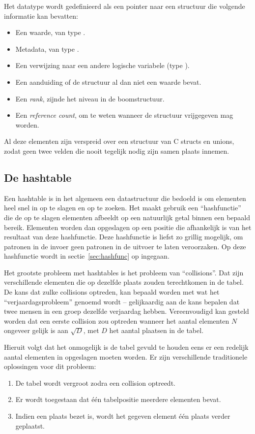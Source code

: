 Het datatype  wordt gedefinieerd als een pointer naar een structuur die volgende informatie kan bevatten: \begin{itemize}
  \item Een waarde, van type .
  \item Metadata, van type .
  \item Een verwijzing naar een andere logische variabele (type ).
  \item Een aanduiding of de structuur al dan niet een waarde bevat.
  \item Een {\em rank}, zijnde het niveau in de boomstructuur.
  \item Een {\em reference count}, om te weten wanneer de structuur vrijgegeven mag worden.
\end{itemize}
Al deze elementen zijn verspreid over een structuur van C structs en unions, zodat geen twee velden die nooit tegelijk nodig zijn samen plaats innemen.

\subsection{De hashtable} \label{sec:hashtable}

Een hashtable is in het algemeen een datastructuur die bedoeld is om elementen heel snel in op te slagen en op te zoeken. Het maakt gebruik een ``hashfunctie'' die de op te slagen elementen afbeeldt op een natuurlijk getal binnen een bepaald bereik. Elementen worden dan opgeslagen op een positie die afhankelijk is van het resultaat van deze hashfunctie. Deze hashfunctie is liefst zo grillig mogelijk, om patronen in de invoer geen patronen in de uitvoer te laten veroorzaken. Op deze hashfunctie wordt in sectie~\ref{sec:hashfunc} op ingegaan.

Het grootste probleem met hashtables is het probleem van ``collisions''. Dat zijn verschillende elementen die op dezelfde plaats zouden terechtkomen in de tabel. De kans dat zulke collisions optreden, kan bepaald worden met wat het ``verjaardagsprobleem'' genoemd wordt -- gelijkaardig aan de kans bepalen dat twee mensen in een groep dezelfde verjaardag hebben. Vereenvoudigd kan gesteld worden dat een eerste collision zou optreden wanneer het aantal elementen $N$ ongeveer gelijk is aan $\sqrt{D}$, met $D$ het aantal plaatsen in de tabel.

Hieruit volgt dat het onmogelijk is de tabel gevuld te houden eens er een redelijk aantal elementen in opgeslagen moeten worden. Er zijn verschillende traditionele oplossingen voor dit probleem: \begin{enumerate}
\item De tabel wordt vergroot zodra een collision optreedt.
\item Er wordt toegestaan dat \'e\'en tabelpositie meerdere elementen bevat.
\item Indien een plaats bezet is, wordt het gegeven element \'e\'en plaats verder geplaatst.
\end{enumerate}

